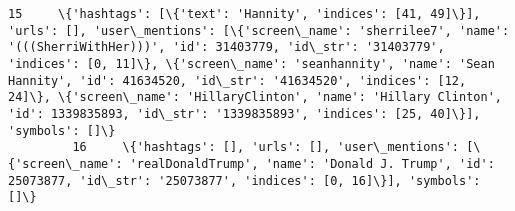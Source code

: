 \documentclass[11pt]{article}
\begin{document}
\begin{Verbatim}[commandchars=\\\{\}]
         15     \{'hashtags': [\{'text': 'Hannity', 'indices': [41, 49]\}], 'urls': [], 'user\_mentions': [\{'screen\_name': 'sherrilee7', 'name': '(((SherriWithHer)))', 'id': 31403779, 'id\_str': '31403779', 'indices': [0, 11]\}, \{'screen\_name': 'seanhannity', 'name': 'Sean Hannity', 'id': 41634520, 'id\_str': '41634520', 'indices': [12, 24]\}, \{'screen\_name': 'HillaryClinton', 'name': 'Hillary Clinton', 'id': 1339835893, 'id\_str': '1339835893', 'indices': [25, 40]\}], 'symbols': []\}                                                                                                                                                                                                                                                                                                                                                                                                                                                                                                                                                                                                                                                                                                                                 
         16     \{'hashtags': [], 'urls': [], 'user\_mentions': [\{'screen\_name': 'realDonaldTrump', 'name': 'Donald J. Trump', 'id': 25073877, 'id\_str': '25073877', 'indices': [0, 16]\}], 'symbols': []\}                                                                                                                                                                                                                                                                                                                                                                                                                                                                                                                                                                                                                                                                                                                                                                                                                                                                                                                                                                                                                        

\end{Verbatim}
\end{document}
